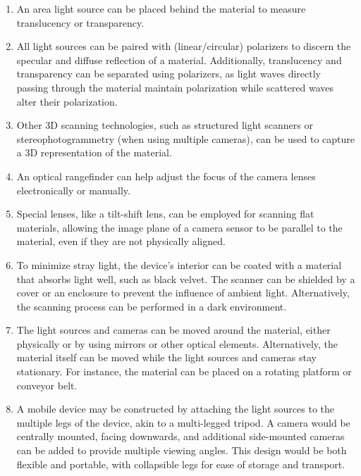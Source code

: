 \documentclass[11pt, twoside, listof=totocnumbered, bibliography=totocnumbered]{scrartcl}
\begin{document}
\begin{enumerate}
	
	\item An area light source can be placed behind the material to measure translucency or transparency.
	
	\item All light sources can be paired with (linear/circular) polarizers to discern the specular and diffuse reflection of a material. Additionally, translucency and transparency can be separated using polarizers, as light waves directly passing through the material maintain polarization while scattered waves alter their polarization.
	
	\item Other 3D scanning technologies, such as structured light scanners or stereophotogrammetry (when using multiple cameras), can be used to capture a 3D representation of the material.
	
	\item An optical rangefinder can help adjust the focus of the camera lenses electronically or manually.
	
	\item Special lenses, like a tilt-shift lens, can be employed for scanning flat materials, allowing the image plane of a camera sensor to be parallel to the material, even if they are not physically aligned.
	
	\item To minimize stray light, the device's interior can be coated with a material that absorbs light well, such as black velvet. The scanner can be shielded by a cover or an enclosure to prevent the influence of ambient light. Alternatively, the scanning process can be performed in a dark environment.
	
	\item The light sources and cameras can be moved around the material, either physically or by using mirrors or other optical elements. Alternatively, the material itself can be moved while the light sources and cameras stay stationary. For instance, the material can be placed on a rotating platform or conveyor belt.
	
	\item A mobile device may be constructed by attaching the light sources to the multiple legs of the device, akin to a multi-legged tripod. A camera would be centrally mounted, facing downwards, and additional side-mounted cameras can be added to provide multiple viewing angles. This design would be both flexible and portable, with collapsible legs for ease of storage and transport.
	

\end{enumerate}
\end{document}
